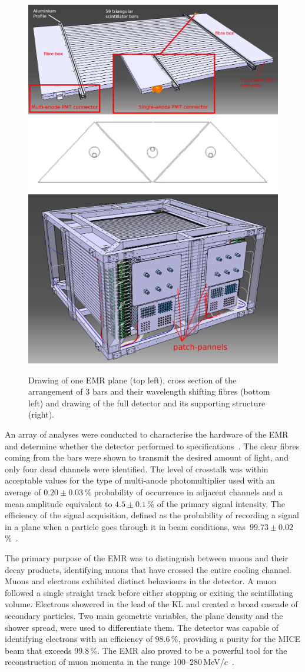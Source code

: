 \begin{figure}[htb!]
	\begin{center}
		\includegraphics[width=0.465\columnwidth]{EMR1.png}
		\hfill
		\includegraphics[width=0.515\columnwidth]{EMR2.jpg}
		\caption{Drawing of one EMR plane (top left), cross section of the arrangement of 3 bars and their wavelength shifting fibres (bottom left) and drawing of the full detector and its supporting structure (right).}
		\label{fig:EMR}
	\end{center}
\end{figure}

An array of analyses were conducted to characterise the hardware of the EMR and determine whether the detector performed to specifications~\cite{Drielsma:2017doj}. The clear fibres coming from the bars were shown to transmit the desired amount of light, and only four dead channels were identified. The level of crosstalk was within acceptable values for the type of multi-anode photomultiplier used with an average of $0.20\pm0.03$\,\% probability of occurrence in adjacent channels and a mean amplitude equivalent to $4.5\pm0.1$\,\% of the primary signal intensity. The efficiency of the signal acquisition, defined as the probability of recording a signal in a plane when a particle goes through it in beam conditions, was~$99.73\pm0.02$\,\%~\cite{2016JInst..11T10007}.

The primary purpose of the EMR was to distinguish between muons and their decay products, identifying muons that have crossed the entire cooling channel. Muons and electrons exhibited distinct behaviours in the detector. A muon followed a single straight track before either stopping or exiting the scintillating volume. Electrons showered in the lead of the KL and created a broad cascade of secondary particles. Two main geometric variables, the plane density and the shower spread, were used to differentiate them. The detector was capable of identifying electrons with an efficiency of 98.6\,\%, providing a purity for the MICE beam that exceeds 99.8\,\%. The EMR also proved to be a powerful tool for the reconstruction of muon momenta in the range 100--280\,MeV/$c$~\cite{2015JInst..10P2012A}.

